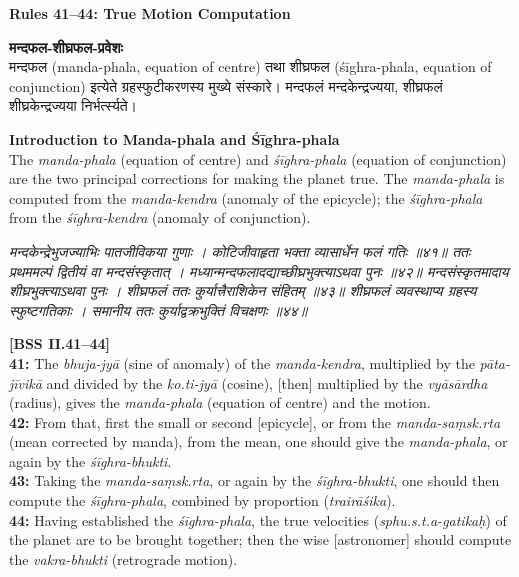 \documentclass[11pt,a4paper]{book}
\newcommand{\dev}[1]{{\devanagarifont #1}}
\newcommand{\bilingual}[2]{%
  \par\vspace{0.6em}%
  \noindent\begin{minipage}[t]{0.48\textwidth}
    \RaggedRight
    #1%
  \end{minipage}%
  \hfill
  \begin{minipage}[t]{0.48\textwidth}
    \RaggedRight
    #2%
  \end{minipage}%
  \par\vspace{0.6em}%
}
\newcommand{\shlokabilingual}[2]{%
  \par\vspace{0.8em}%
  \noindent\begin{minipage}[t]{0.48\textwidth}
    \RaggedRight
    \dev{\textit{#1}}
  \end{minipage}%
  \hfill
  \begin{minipage}[t]{0.48\textwidth}
    \RaggedRight
    #2%
  \end{minipage}%
  \par\vspace{0.8em}%
}
\newcommand{\ruleheadingbilingual}[2]{%
  \par\vspace{0.8em}%
  \noindent\begin{minipage}[t]{0.48\textwidth}
    \textbf{\color{sectioncolor}\dev{#1}}
  \end{minipage}%
  \hfill
  \begin{minipage}[t]{0.48\textwidth}
    \textbf{\color{sectioncolor}#2}
  \end{minipage}%
  \par\vspace{0.4em}%
}
\begin{document}
\ruleheadingbilingual{नियमाः ४१--४४}{Rules 41--44: True Motion Computation}

\bilingual{%
\textbf{\dev{मन्दफल-शीघ्रफल-प्रवेशः}}\\[0.3em]
\dev{मन्दफल} (manda-phala, equation of centre) तथा \dev{शीघ्रफल} (śīghra-phala, equation of conjunction) इत्येते ग्रहस्फुटीकरणस्य मुख्ये संस्कारे। मन्दफलं मन्दकेन्द्रज्यया, शीघ्रफलं शीघ्रकेन्द्रज्यया निर्भर्त्स्यते।
}{%
\textbf{Introduction to Manda-phala and Śīghra-phala}\\[0.3em]
The \textit{manda-phala} (equation of centre) and \textit{śīghra-phala} (equation of conjunction) are the two principal corrections for making the planet true. The \textit{manda-phala} is computed from the \textit{manda-kendra} (anomaly of the epicycle); the \textit{śīghra-phala} from the \textit{śīghra-kendra} (anomaly of conjunction).
}

\vspace{0.5em}

\shlokabilingual{%
मन्दकेन्द्रेभुजज्याभिः पातजीविकया गुणाः ।
कोटिजीवाहृता भक्ता व्यासार्धेन फलं गतिः ॥४१॥
ततः प्रथममल्पं द्वितीयं वा मन्दसंस्कृतात्‌ ।
मध्यान्मन्दफलादद्याच्छीघ्रभुक्त्याऽथवा पुनः ॥४२॥
मन्दसंस्कृतमादाय शीघ्रभुक्त्याऽथवा पुनः ।
शीघ्रफलं ततः कुर्यात्त्रैराशिकेन संहितम्‌ ॥४३॥
शीघ्रफलं व्यवस्थाप्य ग्रहस्य स्फुष्टगतिकाः ।
समानीय ततः कुर्याद्वक्रभुक्तिं विचक्षणः ॥४४॥
}{%
\textbf{[BSS II.41--44]}\\[0.3em]
\textbf{41:} The \textit{bhuja-jyā} (sine of anomaly) of the \textit{manda-kendra}, multiplied by the \textit{pāta-jīvikā} and divided by the \textit{ko.ti-jyā} (cosine), [then] multiplied by the \textit{vyāsārdha} (radius), gives the \textit{manda-phala} (equation of centre) and the motion.\\[0.3em]
\textbf{42:} From that, first the small or second [epicycle], or from the \textit{manda-saṃsk.rta} (mean corrected by manda), from the mean, one should give the \textit{manda-phala}, or again by the \textit{śīghra-bhukti}.\\[0.3em]
\textbf{43:} Taking the \textit{manda-saṃsk.rta}, or again by the \textit{śīghra-bhukti}, one should then compute the \textit{śīghra-phala}, combined by proportion (\textit{trairāśika}).\\[0.3em]
\textbf{44:} Having established the \textit{śīghra-phala}, the true velocities (\textit{sphu.s.t.a-gatikaḥ}) of the planet are to be brought together; then the wise [astronomer] should compute the \textit{vakra-bhukti} (retrograde motion).
}
\end{document}
